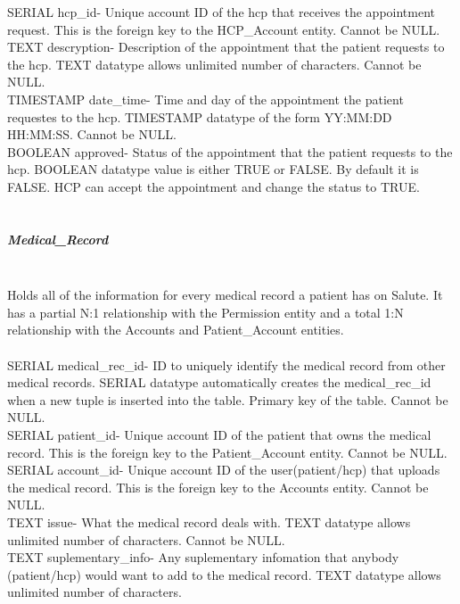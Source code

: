 \documentclass[12pt]{report}
\begin{document}
SERIAL hcp_id- Unique account ID of the hcp that receives the appointment request.  This is the foreign key to the HCP_Account entity.  Cannot be NULL.\\

TEXT descryption- Description of the appointment that the patient requests to the hcp.  TEXT datatype allows unlimited number of characters.  Cannot be NULL.\\

TIMESTAMP date_time- Time and day of the appointment the patient requestes to the hcp.  TIMESTAMP datatype of the form YY:MM:DD HH:MM:SS.  Cannot be NULL.\\

BOOLEAN approved- Status of the appointment that the patient requests to the hcp.  BOOLEAN datatype value is either TRUE or FALSE.  By default it is FALSE.  HCP can accept the appointment and change the status to TRUE.\\ \\

\subparagraph{Medical_Record}\\
Holds all of the information for every medical record a patient has on Salute.  It has a partial N:1 relationship with the Permission entity and a total 1:N relationship with the Accounts and Patient_Account entities.\\ \\

SERIAL medical_rec_id- ID to uniquely identify the medical record from other medical records. SERIAL datatype automatically creates the medical_rec_id when a new tuple is inserted into the table.  Primary key of the table.  Cannot be NULL.\\

SERIAL patient_id- Unique account ID of the patient that owns the medical record.  This is the foreign key to the Patient_Account entity.  Cannot be NULL.\\

SERIAL account_id- Unique account ID of the user(patient/hcp) that uploads the medical record.  This is the foreign key to the Accounts entity.  Cannot be NULL.\\

TEXT issue-  What the medical record deals with.  TEXT datatype allows unlimited number of characters.  Cannot be NULL.\\

TEXT suplementary_info- Any suplementary infomation that anybody (patient/hcp) would want to add to the medical record.  TEXT datatype allows unlimited number of characters.\\
\end{document}

